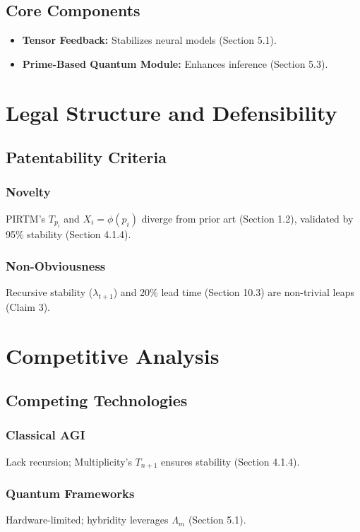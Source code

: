 \documentclass{article}
\theoremstyle{plain}
\theoremstyle{claimstyle}
\begin{document}
\subsection{Core Components}
\begin{itemize}
    \item \textbf{Tensor Feedback:} Stabilizes neural models (Section 5.1).
    \item \textbf{Prime-Based Quantum Module:} Enhances inference (Section 5.3).
\end{itemize}

\section{Legal Structure and Defensibility}
\subsection{Patentability Criteria}
\subsubsection{Novelty}
PIRTM’s \( T_{p_i} \) and \( X_i = \phi(p_i) \) diverge from prior art (Section 1.2), validated by 95\% stability (Section 4.1.4).

\subsubsection{Non-Obviousness}
Recursive stability (\(\lambda_{t+1}\)) and 20\% lead time (Section 10.3) are non-trivial leaps (Claim 3).

\section{Competitive Analysis}
\subsection{Competing Technologies}
\subsubsection{Classical AGI}
Lack recursion; Multiplicity’s \( T_{n+1} \) ensures stability (Section 4.1.4).

\subsubsection{Quantum Frameworks}
Hardware-limited; hybridity leverages \(\Lambda_m\) (Section 5.1).
\end{document}
